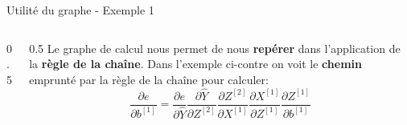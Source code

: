 \begin{frame}{Utilité du graphe - Exemple 1}
\begin{columns}
\begin{column}{0.5\textwidth}
\begin{center}
{\begin{tikzpicture}
					\end{tikzpicture}
				}
			\end{center}
		\end{column}
		\begin{column}{0.5\textwidth}
			Le graphe de calcul nous permet de nous \textbf{repérer} dans l'application de la \textbf{règle de la chaîne}. Dans l'exemple ci-contre on voit le \textbf{chemin} emprunté par la règle de la chaîne pour calculer:
			\begin{equation*}
				\frac{\partial{e}}{\partial{b^{[1]}}} = \frac{\partial{e}}{\partial{\hat{Y}}} \frac{\partial{\hat{Y}}}{\partial{Z^{[2]}}} \frac{\partial{Z^{[2]}}}{\partial{X^{[1]}}} \frac{\partial{X^{[1]}}}{\partial{Z^{[1]}}} \frac{\partial{Z^{[1]}}}{\partial{b^{[1]}}}
			\end{equation*}
		\end{column}
	\end{columns}
\end{frame}

